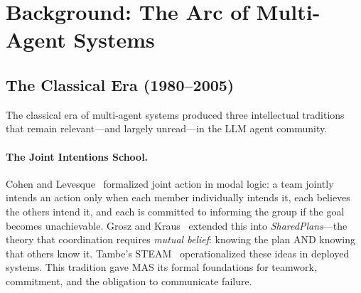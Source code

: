 \documentclass{article}
\begin{document}
\section{Background: The Arc of Multi-Agent Systems}
\label{sec:background}

\subsection{The Classical Era (1980--2005)}
\label{sec:bg-classical}

%
%
%
%
%
%

The classical era of multi-agent systems produced three intellectual traditions that
remain relevant---and largely unread---in the LLM agent community.

\paragraph{The Joint Intentions School.}
Cohen and Levesque~\citep{cohen1990intention} formalized joint action in modal logic:
a team jointly intends an action only when each member individually intends it, each
believes the others intend it, and each is committed to informing the group if the goal
becomes unachievable. Grosz and Kraus~\citep{grosz1996collaborative} extended this into
\emph{SharedPlans}---the theory that coordination requires \emph{mutual belief}: knowing
the plan AND knowing that others know it. Tambe's STEAM~\citep{tambe1997steam}
operationalized these ideas in deployed systems. This tradition gave MAS its formal
foundations for teamwork, commitment, and the obligation to communicate failure.
\end{document}
